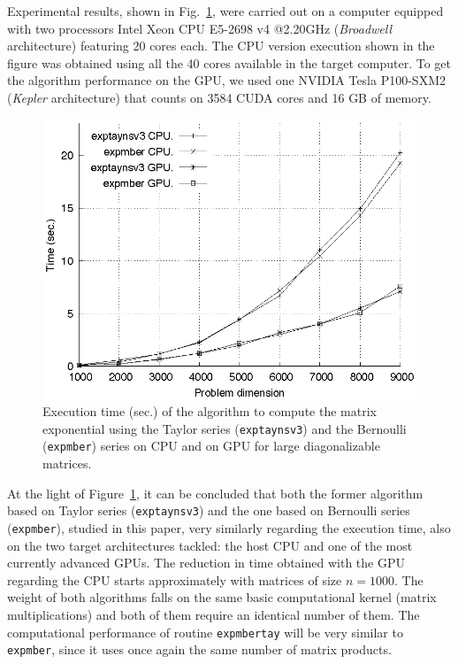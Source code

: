 \documentclass[preprint,10pt,numbers,sort&compress]{elsarticle}
\begin{document}
Experimental results, shown in Fig.~\ref{fig:results_gpu}, were carried out on a computer equipped with two processors 
Intel Xeon CPU E5-2698 v4 @2.20GHz (\emph{Broadwell} architecture) featuring 20 cores each.
The CPU version execution shown in the figure was obtained using all the 40 cores available in the target computer. 
To get the algorithm performance on the GPU, we used one NVIDIA Tesla P100-SXM2 (\emph{Kepler} architecture) that counts on 3584 CUDA cores and 16 GB of memory.

\begin{figure}[!t]
        \setlength{\tabcolsep}{-10pt}
        \begin{center}
                \includegraphics[scale=0.9]{Tiempoparalelo.eps}
        \end{center}
        \caption{\label{fig:results_gpu} Execution time (sec.) of the algorithm to compute the matrix exponential using the Taylor series (\texttt{exptaynsv3}) and the Bernoulli (\texttt{expmber}) series on CPU and on GPU for large diagonalizable matrices.}
\end{figure}

At the light of Figure~\ref{fig:results_gpu}, it can be concluded that both the former algorithm based on Taylor series (\texttt{exptaynsv3}) and the one based on Bernoulli series (\texttt{expmber}), studied in this paper, very similarly regarding the execution time, also on the two target architectures tackled: the host CPU and one of the most currently advanced GPUs.  
The reduction in time obtained with the GPU regarding the CPU starts approximately with matrices of size $n=1000$.
The weight of both algorithms falls on the same basic computational kernel (matrix multiplications) and both of them require an identical number of them. The computational performance of routine \texttt{expmbertay} will be very similar to \texttt{expmber}, since it uses once again the same number of matrix products.
\end{document}

